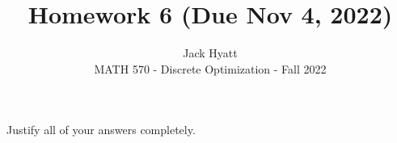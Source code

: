 \documentclass[12pt]{article}
\begin{document}
	
	
	
	\title{Homework 6 (Due Nov 4, 2022)}
	\author{Jack Hyatt\\ %
		MATH 570 - Discrete Optimization - Fall 2022} 
	
	\maketitle
	
	Justify all of your answers completely.\\
	
	\renewcommand{\qedsymbol}{$\blacksquare$}
	
	\medskip 
	
\end{document}
